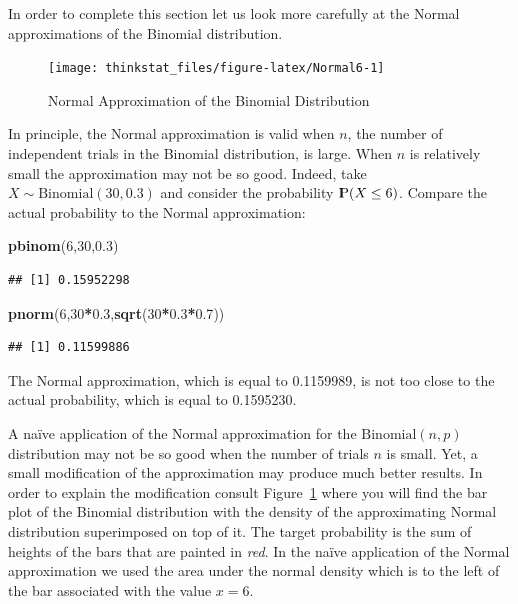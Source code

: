 \documentclass[]{krantz}
\makeatletter
\newenvironment{Shaded}{\begin{snugshade}}{\end{snugshade}}
\newcommand{\KeywordTok}[1]{\textcolor[rgb]{0.13,0.29,0.53}{\textbf{#1}}}
\newcommand{\DecValTok}[1]{\textcolor[rgb]{0.00,0.00,0.81}{#1}}
\newcommand{\FloatTok}[1]{\textcolor[rgb]{0.00,0.00,0.81}{#1}}
\newcommand{\OperatorTok}[1]{\textcolor[rgb]{0.81,0.36,0.00}{\textbf{#1}}}
\newcommand{\NormalTok}[1]{#1}
\newcommand{\Prob}{{\rm I\kern-.3em P}}
\newenvironment{kframe}{%
\medskip{}
\setlength{\fboxsep}{.8em}
 \def\at@end@of@kframe{}%
 \ifinner\ifhmode%
  \def\at@end@of@kframe{\end{minipage}}%
  \begin{minipage}{\columnwidth}%
 \fi\fi%
 \def\FrameCommand##1{\hskip\@totalleftmargin \hskip-\fboxsep
 \colorbox{shadecolor}{##1}\hskip-\fboxsep
     \hskip-\linewidth \hskip-\@totalleftmargin \hskip\columnwidth}%
 \MakeFramed {\advance\hsize-\width
   \@totalleftmargin\z@ \linewidth\hsize
   \@setminipage}}%
 {\par\unskip\endMakeFramed%
 \at@end@of@kframe}
\renewenvironment{Shaded}{\begin{kframe}}{\end{kframe}}
\theoremstyle{definition}
\theoremstyle{definition}
\theoremstyle{definition}
\theoremstyle{remark}
\makeatother
\begin{document}
In order to complete this section let us look more carefully at the
Normal approximations of the Binomial distribution.

\begin{figure}

{\centering \texttt{[image: thinkstat\_files/figure-latex/Normal6-1]} 

}

\caption{Normal Approximation of the Binomial Distribution}\label{fig:Normal6}
\end{figure}

In principle, the Normal approximation is valid when \(n\), the number
of independent trials in the Binomial distribution, is large. When \(n\)
is relatively small the approximation may not be so good. Indeed, take
\(X \sim \mathrm{Binomial}(30,0.3)\) and consider the probability
\(\Prob(X \leq 6)\). Compare the actual probability to the Normal
approximation:

\begin{Shaded}
\begin{Highlighting}[]
\KeywordTok{pbinom}\NormalTok{(}\DecValTok{6}\NormalTok{,}\DecValTok{30}\NormalTok{,}\FloatTok{0.3}\NormalTok{)}
\end{Highlighting}
\end{Shaded}

\begin{verbatim}
## [1] 0.15952298
\end{verbatim}

\begin{Shaded}
\begin{Highlighting}[]
\KeywordTok{pnorm}\NormalTok{(}\DecValTok{6}\NormalTok{,}\DecValTok{30}\OperatorTok{*}\FloatTok{0.3}\NormalTok{,}\KeywordTok{sqrt}\NormalTok{(}\DecValTok{30}\OperatorTok{*}\FloatTok{0.3}\OperatorTok{*}\FloatTok{0.7}\NormalTok{))}
\end{Highlighting}
\end{Shaded}

\begin{verbatim}
## [1] 0.11599886
\end{verbatim}

The Normal approximation, which is equal to 0.1159989, is not too close
to the actual probability, which is equal to 0.1595230.

A naïve application of the Normal approximation for the
\(\mathrm{Binomial}(n,p)\) distribution may not be so good when the
number of trials \(n\) is small. Yet, a small modification of the
approximation may produce much better results. In order to explain the
modification consult Figure~\ref{fig:Normal6} where you will find the
bar plot of the Binomial distribution with the density of the
approximating Normal distribution superimposed on top of it. The target
probability is the sum of heights of the bars that are painted in
\emph{red}. In the naïve application of the Normal approximation we used
the area under the normal density which is to the left of the bar
associated with the value \(x=6\).
\end{document}
